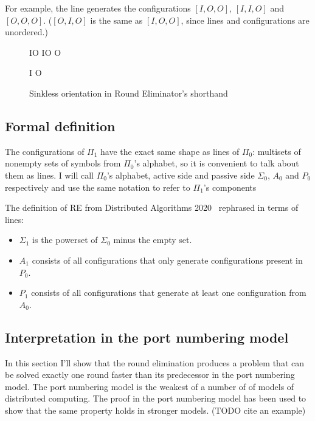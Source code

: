 \documentclass[english, 12pt, a4paper, sci, a-1b, online]{aaltothesis}
\begin{document}
For example, the line  generates the configurations $[I, O, O]$, $[I, I, O]$ and $[O, O, O]$. ($[O, I, O]$ is the same as $[I, O, O]$, since lines and configurations are unordered.)

\begin{figure}[h]
  \centering
  \begin{tcolorbox}[width=.22\textwidth, nobeforeafter, title=active side]
  IO IO O
  \end{tcolorbox}
  \begin{tcolorbox}[width=.22\textwidth, nobeforeafter, title=passive side]
  I O
  \end{tcolorbox}
  \caption{Sinkless orientation in Round Eliminator's shorthand}
\end{figure}

\subsection{Formal definition}
The configurations of $\Pi_1$ have the exact same shape as lines of $\Pi_0$: multisets of nonempty sets of symbols from $\Pi_0$'s alphabet, so it is convenient to talk about them as lines. I will call $\Pi_0$'s alphabet, active side and passive side $\Sigma_0$, $A_0$ and $P_{0}$ respectively and use the same notation to refer to $\Pi_{1}$'s components

The definition of RE from Distributed Algorithms 2020~\cite{DA2020} rephrased in terms of lines:
\begin{itemize}
  \item $\Sigma_1$ is the powerset of $\Sigma_0$ minus the empty set.
  \item $A_{1}$ consists of all configurations that only generate configurations present in $P_{0}$.
  \item $P_1$ consists of all configurations that generate at least one configuration from $A_0$.
\end{itemize}

\subsection{Interpretation in the port numbering model}

In this section I'll show that the round elimination produces a problem that can be solved exactly one round faster than its predecessor in the port numbering model. The port numbering model is the weakest of a number of of models of distributed computing. The proof in the port numbering model has been used to show that the same property holds in stronger models. (TODO cite an example)
\end{document}
